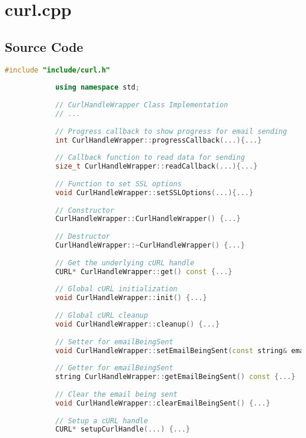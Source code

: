 \documentclass{article}
\begin{document}
	\section{curl.cpp}
	
	\subsection*{Source Code}
	\begin{mdframed}[backgroundcolor=background, hidealllines=false, innerleftmargin=15pt, innerrightmargin=5pt, innertopmargin=0pt, innerbottommargin=-5pt]
		\begin{lstlisting}[language=C++]
			#include "include/curl.h"
			
			using namespace std;
			
			// CurlHandleWrapper Class Implementation
			// ...
			
			// Progress callback to show progress for email sending
			int CurlHandleWrapper::progressCallback(...){...}
			
			// Callback function to read data for sending
			size_t CurlHandleWrapper::readCallback(...){...}
			
			// Function to set SSL options
			void CurlHandleWrapper::setSSLOptions(...){...}
			
			// Constructor
			CurlHandleWrapper::CurlHandleWrapper() {...}
			
			// Destructor
			CurlHandleWrapper::~CurlHandleWrapper() {...}
			
			// Get the underlying cURL handle
			CURL* CurlHandleWrapper::get() const {...}
			
			// Global cURL initialization
			void CurlHandleWrapper::init() {...}
			
			// Global cURL cleanup
			void CurlHandleWrapper::cleanup() {...}
			
			// Setter for emailBeingSent
			void CurlHandleWrapper::setEmailBeingSent(const string& email) {...}
			
			// Getter for emailBeingSent
			string CurlHandleWrapper::getEmailBeingSent() const {...}
			
			// Clear the email being sent
			void CurlHandleWrapper::clearEmailBeingSent() {...}
			
			// Setup a cURL handle
			CURL* setupCurlHandle(...) {...}
		\end{lstlisting}
	\end{mdframed}
	
\end{document}
